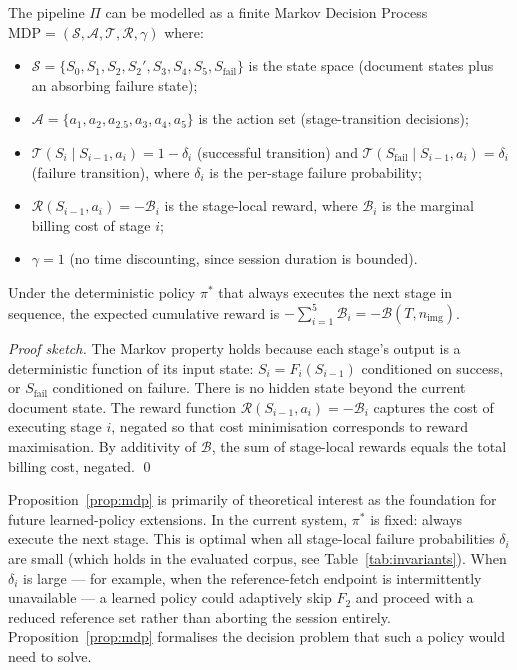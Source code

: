 \begin{proposition}
\label{prop:mdp}
The pipeline $\Pi$ can be modelled as a finite Markov Decision Process
$\mathrm{MDP}=(\mathcal{S},\mathcal{A},\mathcal{T},\mathcal{R},\gamma)$ where:
\begin{itemize}
  \item $\mathcal{S}=\{S_0,S_1,S_2,S_2',S_3,S_4,S_5,S_{\mathrm{fail}}\}$
        is the state space (document states plus an absorbing failure state);
  \item $\mathcal{A}=\{a_1,a_2,a_{2.5},a_3,a_4,a_5\}$ is the action set
        (stage-transition decisions);
  \item $\mathcal{T}(S_i\mid S_{i-1},a_i)=1-\delta_i$ (successful transition)
        and $\mathcal{T}(S_{\mathrm{fail}}\mid S_{i-1},a_i)=\delta_i$
        (failure transition), where $\delta_i$ is the per-stage failure probability;
  \item $\mathcal{R}(S_{i-1},a_i)=-\mathcal{B}_i$ is the stage-local reward,
        where $\mathcal{B}_i$ is the marginal billing cost of stage $i$;
  \item $\gamma=1$ (no time discounting, since session duration is bounded).
\end{itemize}
Under the deterministic policy $\pi^*$ that always executes the next stage in sequence,
the expected cumulative reward is $-\sum_{i=1}^{5}\mathcal{B}_i = -\mathcal{B}(T,n_{\mathrm{img}})$.
\end{proposition}

\begin{proof}[Proof sketch]
The Markov property holds because each stage's output is a deterministic function
of its input state: $S_i = F_i(S_{i-1})$ conditioned on success, or $S_{\mathrm{fail}}$
conditioned on failure.
There is no hidden state beyond the current document state.
The reward function $\mathcal{R}(S_{i-1},a_i)=-\mathcal{B}_i$ captures the cost of
executing stage $i$, negated so that cost minimisation corresponds to reward maximisation.
By additivity of $\mathcal{B}$, the sum of stage-local rewards equals the total billing
cost, negated. \qed
\end{proof}

Proposition~\ref{prop:mdp} is primarily of theoretical interest as the foundation
for future learned-policy extensions.
In the current system, $\pi^*$ is fixed: always execute the next stage.
This is optimal when all stage-local failure probabilities $\delta_i$ are small
(which holds in the evaluated corpus, see Table~\ref{tab:invariants}).
When $\delta_i$ is large — for example, when the reference-fetch endpoint is
intermittently unavailable — a learned policy could adaptively skip $F_2$ and
proceed with a reduced reference set rather than aborting the session entirely.
Proposition~\ref{prop:mdp} formalises the decision problem that such a policy would need to solve.

